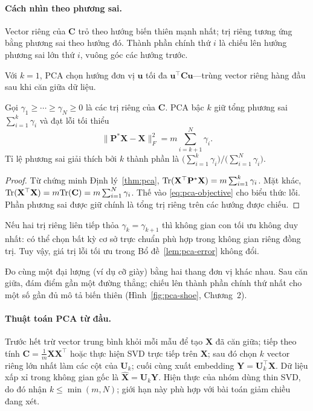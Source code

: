 \paragraph{Cách nhìn theo phương sai.}
Vector riêng của $\mathbf{C}$ trỏ theo hướng biến thiên mạnh nhất; trị riêng tương ứng bằng phương sai theo hướng đó. Thành phần chính thứ $i$ là chiếu lên hướng phương sai lớn thứ $i$, vuông góc các hướng trước.

\begin{extension}
Với $k=1$, PCA chọn hướng đơn vị $\mathbf{u}$ tối đa $\mathbf{u}^\top\mathbf{C}\mathbf{u}$---trùng vector riêng hàng đầu sau khi căn giữa dữ liệu.
\end{extension}

\begin{lemma}
\label{lem:pca-error}
Gọi $\gamma_1 \geq \cdots \geq \gamma_N \geq 0$ là các trị riêng của
$\mathbf{C}$. PCA bậc $k$ giữ tổng phương sai
$\sum_{i=1}^k\gamma_i$ và đạt lỗi tối thiểu
\[
  \|\mathbf{P}^*\mathbf{X}-\mathbf{X}\|_F^2
  = m\sum_{i=k+1}^{N}\gamma_i.
\]
Tỉ lệ phương sai giải thích bởi $k$ thành phần là
$\big(\sum_{i=1}^k\gamma_i\big)/\big(\sum_{i=1}^N\gamma_i\big)$.
\end{lemma}

\begin{proof}
Từ chứng minh Định lý~\ref{thm:pca},
$\mathrm{Tr}(\mathbf{X}^\top\mathbf{P}^*\mathbf{X})
=m\sum_{i=1}^k\gamma_i$. Mặt khác,
$\mathrm{Tr}(\mathbf{X}^\top\mathbf{X})=m\mathrm{Tr}(\mathbf{C})
=m\sum_{i=1}^N\gamma_i$. Thế vào \eqref{eq:pca-objective} cho biểu thức
lỗi. Phần phương sai được giữ chính là tổng trị riêng trên các hướng
được chiếu.
\end{proof}

\begin{extension}
Nếu hai trị riêng liên tiếp thỏa $\gamma_k = \gamma_{k+1}$ thì không gian con tối ưu không duy nhất: có thể chọn bất kỳ cơ sở trực chuẩn phù hợp trong không gian riêng đồng trị. Tuy vậy, giá trị lỗi tối ưu trong Bổ đề~\ref{lem:pca-error} không đổi.
\end{extension}

\begin{example}
Đo cùng một đại lượng (ví dụ cỡ giày) bằng hai thang đơn vị khác nhau. Sau căn giữa, đám điểm gần một đường thẳng; chiếu lên thành phần chính thứ nhất cho một số gần đủ mô tả biến thiên (Hình~\ref{fig:pca-shoe}, Chương~2).
\end{example}

\paragraph{Thuật toán PCA từ đầu.}
Trước hết trừ vector trung bình khỏi mỗi mẫu để tạo $\mathbf{X}$ đã căn giữa; tiếp theo tính $\mathbf{C} = \frac{1}{m}\mathbf{X}\mathbf{X}^\top$ hoặc thực hiện SVD trực tiếp trên $\mathbf{X}$; sau đó chọn $k$ vector riêng lớn nhất làm các cột của $\mathbf{U}_k$; cuối cùng xuất embedding $\mathbf{Y} = \mathbf{U}_k^\top\mathbf{X}$. Dữ liệu xấp xỉ trong không gian gốc là $\hat{\mathbf{X}} = \mathbf{U}_k\mathbf{Y}$. Hiện thực của nhóm dùng thin SVD, do đó nhận $k \leq \min(m, N)$; giới hạn này phù hợp với bài toán giảm chiều đang xét.

